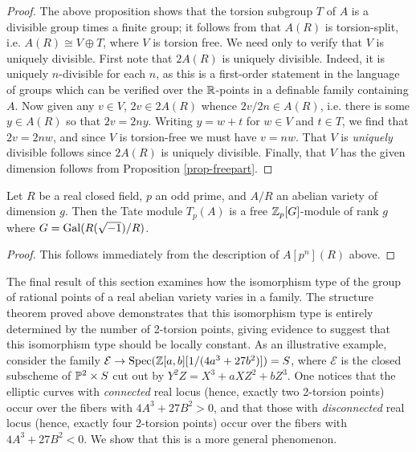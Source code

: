 \begin{proof}
The above proposition shows that the torsion subgroup $T$ of $A$ is a divisible group times a finite group; it follows from \cite[Theorem 8.1]{baer} that $A(R)$ is torsion-split, i.e. $A(R)\cong V\oplus T$, where $V$ is torsion free. We need only to verify that $V$ is uniquely divisible. First note that $2A(R)$ is uniquely divisible. Indeed, it is uniquely $n$-divisible for each $n$, as this is a first-order statement in the language of groups which can be verified over the $\mathbb{R}$-points in a definable family containing $A$. Now given any $v\in V$, $2v\in 2A(R)$ whence $2v/2n\in A(R)$, i.e. there is some $y\in A(R)$ so that $2v=2ny$. Writing $y=w+t$ for $w\in V$ and $t\in T$, we find that $2v=2nw$, and since $V$ is torsion-free we must have $v=nw$. That $V$ is \emph{uniquely} divisible follows since $2A(R)$ is uniquely divisible. Finally, that $V$ has the given dimension follows from Proposition \ref{prop-freepart}.
\end{proof}

\begin{corollary}
Let $R$ be a real closed field, $p$ an odd prime, and $A/R$ an abelian variety of dimension $g$. Then the Tate module $T_p(A)$ is a free $\mathbb{Z}_p[G]$-module of rank $g$ where $G=\operatorname{Gal}(R(\sqrt{-1})/R)$.
\end{corollary}
\begin{proof}
This follows immediately from the description of $A[p^n](R)$ above.
\end{proof}

The final result of this section examines how the isomorphism type of the group of rational points of a real abelian variety varies in a family. The structure theorem proved above demonstrates that this isomorphism type is entirely determined by the number of 2-torsion points, giving evidence to suggest that this isomorphism type should be locally constant. As an illustrative example, consider the family $\mathcal{E}\rightarrow \operatorname{Spec}(\mathbb{Z}[a,b][1/(4a^3+27b^2)])=S$, where $\mathcal{E}$ is the closed subscheme of $\mathbb{P}^2\times S$ cut out by $Y^2Z=X^3+aXZ^2+bZ^3$. One notices that the elliptic curves with \emph{connected} real locus (hence, exactly two 2-torsion points) occur over the fibers with $4A^3+27B^2>0$, and that those with \emph{disconnected} real locus (hence, exactly four 2-torsion points) occur over the fibers with $4A^3+27B^2<0$. We show that this is a more general phenomenon.

